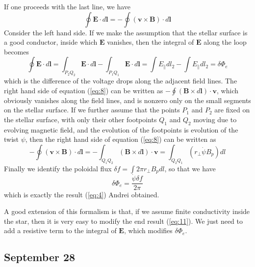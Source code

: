 \documentclass[letterpaper, 11pt]{article}
\numberwithin{equation}{section}
\numberwithin{figure}{section}
\begin{document}
If one proceeds with the last line, we have
\begin{equation}
    \label{eq:8}
    \oint \boldsymbol{E}\cdot d\boldsymbol{l} = - \oint (\boldsymbol{v}\times \boldsymbol{B})\cdot d\boldsymbol{l}
\end{equation}
Consider the left hand side. If we make the assumption that the stellar surface is a good conductor, inside which $\boldsymbol{E}$ vanishes, then the integral of $\boldsymbol{E}$ along the loop becomes
\begin{equation}
    \label{eq:9}
    \oint \boldsymbol{E}\cdot d\boldsymbol{l} = \int_{P_2Q_2}\boldsymbol{E}\cdot d\boldsymbol{l} - \int_{P_1Q_1}\boldsymbol{E}\cdot d\boldsymbol{l} = \int E_{\parallel} dl_2 - \int E_{\parallel} dl_2 = \delta \Phi_{e}
\end{equation}
which is the difference of the voltage drops along the adjacent field lines. The right hand side of equation (\ref{eq:8}) can be written as $-\oint (\boldsymbol{B}\times d\boldsymbol{l})\cdot \boldsymbol{v}$, which obviously vanishes along the field lines, and is nonzero only on the small segments on the stellar surface. If we further assume that the points $P_1$ and $P_2$ are fixed on the stellar surface, with only their other footpoints $Q_1$ and $Q_2$ moving due to evolving magnetic field, and the evolution of the footpoints is evolution of the twist $\psi$, then the right hand side of equation (\ref{eq:8}) can be written as
\begin{equation}
    \label{eq:10}
    - \oint (\boldsymbol{v}\times \boldsymbol{B})\cdot d\boldsymbol{l} = - \int_{Q_1Q_2}(\boldsymbol{B}\times d\boldsymbol{l})\cdot \boldsymbol{v} = \int_{Q_2Q_1}(r_{\perp}\dot{\psi}B_p)dl
\end{equation}
Finally we identify the poloidal flux $\delta f = \int 2\pi r_{\perp}B_pdl$, so that we have
\begin{equation}
    \label{eq:11}
    \delta \Phi_e = \frac{\dot{\psi}\delta f}{2\pi}
\end{equation}
which is exactly the result (\ref{eq:4}) Andrei obtained.

A good extension of this formalism is that, if we assume finite conductivity inside the star, then it is very easy to modify the end result (\ref{eq:11}). We just need to add a resistive term to the integral of $\boldsymbol{E}$, which modifies $\delta \Phi_e$.

\subsection{September 28}
\label{sec:sept-28}
\end{document}
